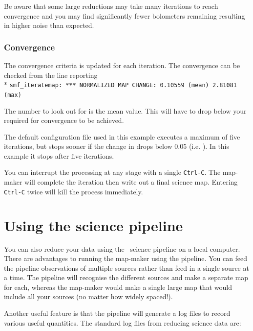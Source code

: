 \documentclass[11pt,oneside,chapters]{starlink}
\begin{document}
Be aware that some large reductions may take many iterations to reach
convergence and you may find significantly fewer bolometers remaining
resulting in higher noise than expected.

\subsubsection{Convergence}

The convergence criteria  is updated for each
iteration. The convergence can be checked from the line reporting\\*
\hspace*{0.5cm} \texttt{smf\_iteratemap: *** NORMALIZED MAP CHANGE:
  0.10559 (mean) 2.81081 (max)}

The number to look out for is the mean value. This will have to drop
below your required  for convergence to be achieved.

The default configuration file used in this example executes a maximum
of five iterations, but stops sooner if the change in 
drops below 0.05 (i.e. ). In this example it
stops after five iterations.



\begin{tip}
  You can interrupt the processing at any stage with a single
  \texttt{Ctrl-C}. The map-maker will complete the iteration then
  write out a final science map. Entering \texttt{Ctrl-C} twice will
  kill the process immediately.
\end{tip}

\section{Using the science pipeline}

You can also reduce your data using the \oracdr\ science pipeline on a
local computer. There are advantages to running the map-maker using
the pipeline. You can feed the pipeline observations of multiple
sources rather than feed in a single source at a time. The pipeline
will recognise the different sources and make a separate map for each,
whereas the map-maker would make a single large map that would include
all your sources (no matter how widely spaced!).

Another useful feature is that the pipeline will generate a log files
to record various useful quantities. The standard log files from
reducing science data are:
\end{document}
